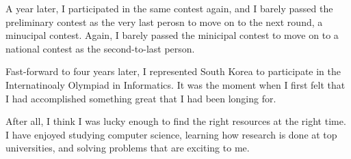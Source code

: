 A year later, I participated in the same contest again, and I barely passed the preliminary contest as the very last perosn to move on to the next round, a minucipal contest. Again, I barely passed the minicipal contest to move on to a national contest as the second-to-last person. 

Fast-forward to four years later, I represented South Korea to participate in the Internatinoaly Olympiad in Informatics. It was the moment when I first felt that I had accomplished something great that I had been longing for. 




After all, I think I was lucky enough to find the right resources at the right time.  I have enjoyed studying computer science, learning how research is done at top universities, and solving problems that are exciting to me.


